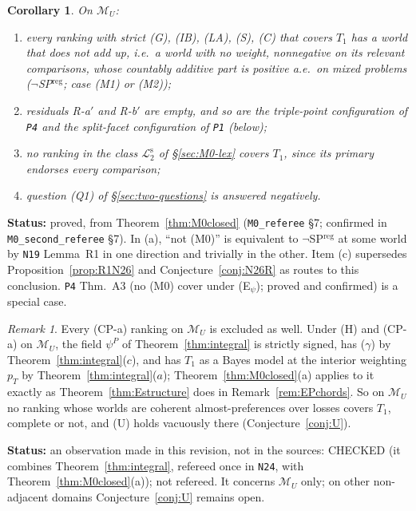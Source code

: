 \documentclass[11pt]{article}
\newtheorem{corollary}[theorem]{Corollary}
\theoremstyle{definition}
\theoremstyle{remark}
\newtheorem{remark}[theorem]{Remark}
\newcommand{\M}{\mathcal M}
\newcommand{\src}[1]{\texttt{#1}}
\newcommand{\status}[1]{\par\smallskip\noindent\textbf{Status:} #1\par\smallskip}
\newcommand{\Ltwo}{\mathcal L_2^{\mathrm s}}
\begin{document}
\begin{corollary}\label{cor:M0closed}
On $\M_U$:
\begin{enumerate}[leftmargin=*,label=(\alph*)]
\item every ranking with strict (G), (IB), (LA), (S), (C) that covers $T_1$ has a world that does not add up, i.e.\ a world with no weight, nonnegative on its relevant comparisons, whose countably additive part is positive a.e.\ on mixed problems ($\neg$SP$^{\mathrm{reg}}$; case (M1) or (M2));
\item residuals R-a$'$ and R-b$'$ are empty, and so are the triple-point configuration of \src{P4} and the split-facet configuration of \src{P1} (below);
\item no ranking in the class $\Ltwo$ of \S\ref{sec:M0-lex} covers $T_1$, since its primary endorses every comparison;
\item question (Q1) of \S\ref{sec:two-questions} is answered negatively.
\end{enumerate}
\end{corollary}
\status{proved, from Theorem~\ref{thm:M0closed} (\src{M0\_referee} \S7; confirmed in \src{M0\_second\_referee} \S7). In (a), ``not (M0)'' is equivalent to $\neg$SP$^{\mathrm{reg}}$ at some world by \src{N19} Lemma~R1 in one direction and trivially in the other. Item (c) supersedes Proposition~\ref{prop:R1N26} and Conjecture~\ref{conj:N26R} as routes to this conclusion. \src{P4} Thm.~A3 (no (M0) cover under (E$_\psi$); proved and confirmed) is a special case.}

\begin{remark}\label{rem:CPaU}
Every (CP-a) ranking on $\M_U$ is excluded as well. Under (H) and (CP-a) on $\M_U$, the field $\psi^P$ of Theorem~\ref{thm:integral} is strictly signed, has ($\gamma$) by Theorem~\ref{thm:integral}($c$), and has $T_1$ as a Bayes model at the interior weighting $p_T$ by Theorem~\ref{thm:integral}($a$); Theorem~\ref{thm:M0closed}(a) applies to it exactly as Theorem~\ref{thm:Estructure} does in Remark~\ref{rem:EPchords}. So on $\M_U$ no ranking whose worlds are coherent almost-preferences over losses covers $T_1$, complete or not, and (U) holds vacuously there (Conjecture~\ref{conj:U}).
\end{remark}
\status{an observation made in this revision, not in the sources: CHECKED (it combines Theorem~\ref{thm:integral}, refereed once in \src{N24}, with Theorem~\ref{thm:M0closed}(a)); not refereed. It concerns $\M_U$ only; on other non-adjacent domains Conjecture~\ref{conj:U} remains open.}
\end{document}
